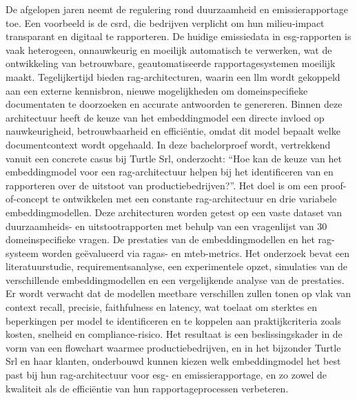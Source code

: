 \documentclass[dutch,dit,thesis]{hogentreport}
\begin{document}
De afgelopen jaren neemt de regulering rond duurzaamheid en emissierapportage toe. Een voorbeeld is de \gls{csrd}, die bedrijven verplicht om hun milieu-impact transparant en digitaal te rapporteren. De huidige emissiedata in \gls{esg}-rapporten is vaak heterogeen, onnauwkeurig en moeilijk automatisch te verwerken, wat de ontwikkeling van betrouwbare, geautomatiseerde rapportagesystemen moeilijk maakt. Tegelijkertijd bieden \gls{rag}-architecturen, waarin een \gls{llm} wordt gekoppeld aan een externe kennisbron, nieuwe mogelijkheden om domeinspecifieke documentaten te doorzoeken en accurate antwoorden te genereren. Binnen deze architectuur heeft de keuze van het embeddingmodel een directe invloed op nauwkeurigheid, betrouwbaarheid en efficiëntie, omdat dit model bepaalt welke documentcontext wordt opgehaald. In deze bachelorproef wordt, vertrekkend vanuit een concrete casus bij Turtle Srl, onderzocht: ``Hoe kan de keuze van het embeddingmodel voor een \gls{rag}-architectuur helpen bij het identificeren van en rapporteren over de uitstoot van productiebedrijven?''. Het doel is om een proof-of-concept te ontwikkelen met een constante \gls{rag}-architectuur en drie variabele embeddingmodellen. Deze architecturen worden getest op een vaste dataset van duurzaamheids- en uitstootrapporten met behulp van een vragenlijst van 30 domeinspecifieke vragen. De prestaties van de embeddingmodellen en het \gls{rag}-systeem worden geëvalueerd via \gls{ragas}- en \gls{mteb}-metrics. Het onderzoek bevat een literatuurstudie, requirementsanalyse, een experimentele opzet, simulaties van de verschillende embeddingmodellen en een vergelijkende analyse van de prestaties. Er wordt verwacht dat de modellen meetbare verschillen zullen tonen op vlak van context recall, precisie, faithfulness en latency, wat toelaat om sterktes en beperkingen per model te identificeren en te koppelen aan praktijkcriteria zoals kosten, snelheid en compliance-risico. Het resultaat is een beslissingskader in de vorm van een flowchart waarmee productiebedrijven, en in het bijzonder Turtle Srl en haar klanten, onderbouwd kunnen kiezen welk embeddingmodel het best past bij hun \gls{rag}-architectuur voor \gls{esg}- en emissierapportage, en zo zowel de kwaliteit als de efficiëntie van hun rapportageprocessen verbeteren.



%


\backmatter{}

\setlength\bibitemsep{2pt} %
\printbibliography[heading=bibintoc]
\end{document}
